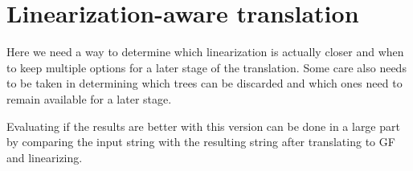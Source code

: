 
\section{Linearization-aware translation}
Here we need a way to determine which linearization is actually closer and when to keep multiple options for a later stage of the translation. Some care also needs to be taken in determining which trees can be discarded and which ones need to remain available for a later stage.

Evaluating if the results are better with this version can be done in a large part by comparing the input string with the resulting string after translating to GF and linearizing.
